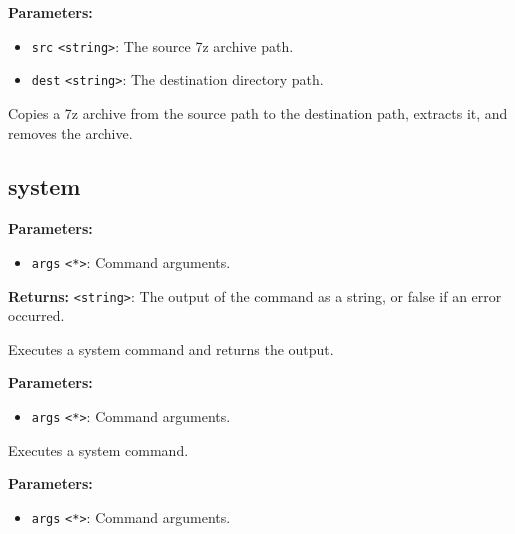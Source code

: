 \documentclass[12pt,a4paper]{article}
\begin{document}
\noindent \textbf{Parameters:}
\begin{itemize}
  \item \texttt{src} \texttt{<string>}: The source 7z archive path.
  \item \texttt{dest} \texttt{<string>}: The destination directory path.
\end{itemize}

\noindent Copies a 7z archive from the source path to the destination path, extracts it, and removes the archive.


\subsection{system}
\vspace{5mm}
\noindent {}


\noindent \textbf{Parameters:}
\begin{itemize}
  \item \texttt{args} \texttt{<*>}: Command arguments.
\end{itemize}

\noindent \textbf{Returns:} \texttt{<string>}: The output of the command as a string, or false if an error occurred.

\noindent Executes a system command and returns the output.

\vspace{5mm}
\noindent {}


\noindent \textbf{Parameters:}
\begin{itemize}
  \item \texttt{args} \texttt{<*>}: Command arguments.
\end{itemize}

\noindent Executes a system command.

\vspace{5mm}
\noindent {}


\noindent \textbf{Parameters:}
\begin{itemize}
  \item \texttt{args} \texttt{<*>}: Command arguments.
\end{itemize}
\end{document}
